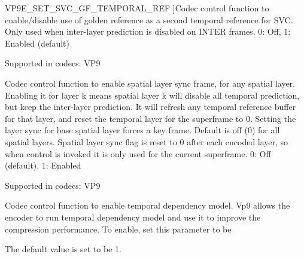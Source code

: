 \begin{Desc}
\begin{description}
{V\+P9\+E\+\_\+\+S\+E\+T\+\_\+\+S\+V\+C\+\_\+\+G\+F\+\_\+\+T\+E\+M\+P\+O\+R\+A\+L\+\_\+\+R\+EF\hypertarget{group__vp8__encoder_gga6deae3d561c838952552c3d3756322eca3f592e28996106e5f4cf7d3be44f4fbf}{}\label{group__vp8__encoder_gga6deae3d561c838952552c3d3756322eca3f592e28996106e5f4cf7d3be44f4fbf}
}]Codec control function to enable/disable use of golden reference as a second temporal reference for S\+VC. Only used when inter-\/layer prediction is disabled on I\+N\+T\+ER frames. 0\+: Off, 1\+: Enabled (default)

Supported in codecs\+: V\+P9 \item[{\em 
V\+P9\+E\+\_\+\+S\+E\+T\+\_\+\+S\+V\+C\+\_\+\+S\+P\+A\+T\+I\+A\+L\+\_\+\+L\+A\+Y\+E\+R\+\_\+\+S\+Y\+NC\hypertarget{group__vp8__encoder_gga6deae3d561c838952552c3d3756322eca75400bbb30c8e4c3690446bea6ac2be3}{}\label{group__vp8__encoder_gga6deae3d561c838952552c3d3756322eca75400bbb30c8e4c3690446bea6ac2be3}
}]Codec control function to enable spatial layer sync frame, for any spatial layer. Enabling it for layer k means spatial layer k will disable all temporal prediction, but keep the inter-\/layer prediction. It will refresh any temporal reference buffer for that layer, and reset the temporal layer for the superframe to 0. Setting the layer sync for base spatial layer forces a key frame. Default is off (0) for all spatial layers. Spatial layer sync flag is reset to 0 after each encoded layer, so when control is invoked it is only used for the current superframe. 0\+: Off (default), 1\+: Enabled

Supported in codecs\+: V\+P9 \item[{\em 
V\+P9\+E\+\_\+\+S\+E\+T\+\_\+\+T\+PL\hypertarget{group__vp8__encoder_gga6deae3d561c838952552c3d3756322eca8cc35557a64db25075d35e2b34373864}{}\label{group__vp8__encoder_gga6deae3d561c838952552c3d3756322eca8cc35557a64db25075d35e2b34373864}
}]Codec control function to enable temporal dependency model. Vp9 allows the encoder to run temporal dependency model and use it to improve the compression performance. To enable, set this parameter to be
\begin{DoxyEnumerate}
\item The default value is set to be 1. 
\end{DoxyEnumerate}\end{description}
\end{Desc}
